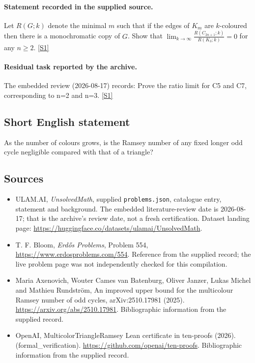 \documentclass[11pt,a4paper]{article}
\newcommand{\sref}[2]{\hyperlink{source:#1:#2}{[S#2]}}
\begin{document}
\paragraph{Statement recorded in the supplied source.}
Let $R(G;k)$ denote the minimal $m$ such that if the edges of $K_m$ are $k$-coloured then there is a monochromatic copy of $G$. Show that $ \lim_{k\to \infty}\frac{R(C_{2n+1};k)}{R(K_3;k)}=0 $ for any $n\geq 2$. \sref{statement}{1}

\paragraph{Residual task reported by the archive.}

The embedded review (2026-08-17) records: Prove the ratio limit for C5 and C7, corresponding to n=2 and n=3. \sref{statement}{1}

\subsection{Short English statement}

As the number of colours grows, is the Ramsey number of any fixed longer odd cycle negligible compared with that of a triangle?

\subsection{Sources}

{\small

\begin{itemize}

\item[\hypertarget{source:statement:1}{S1}] ULAM.AI, \emph{UnsolvedMath}, supplied \texttt{problems.json}, catalogue entry, statement and background. The embedded literature-review date is 2026-08-17; that is the archive’s review date, not a fresh certification. Dataset landing page: \url{https://huggingface.co/datasets/ulamai/UnsolvedMath}.

\item[\hypertarget{source:statement:2}{S2}] T. F. Bloom, \emph{Erdős Problems}, Problem 554, \url{https://www.erdosproblems.com/554}. Reference from the supplied record; the live problem page was not independently checked for this compilation.

\item[\hypertarget{source:statement:3}{S3}] Maria Axenovich, Wouter Cames van Batenburg, Oliver Janzer, Lukas Michel and Mathieu Rundström, An improved upper bound for the multicolour Ramsey number of odd cycles, arXiv:2510.17981 (2025). \url{https://arxiv.org/abs/2510.17981}. Bibliographic information from the supplied record.

\item[\hypertarget{source:statement:4}{S4}] OpenAI, MulticolorTriangleRamsey Lean certificate in ten-proofs (2026). (formal\_verification). \url{https://github.com/openai/ten-proofs}. Bibliographic information from the supplied record.

\end{itemize}

}

\label{end:statement}
\end{document}
